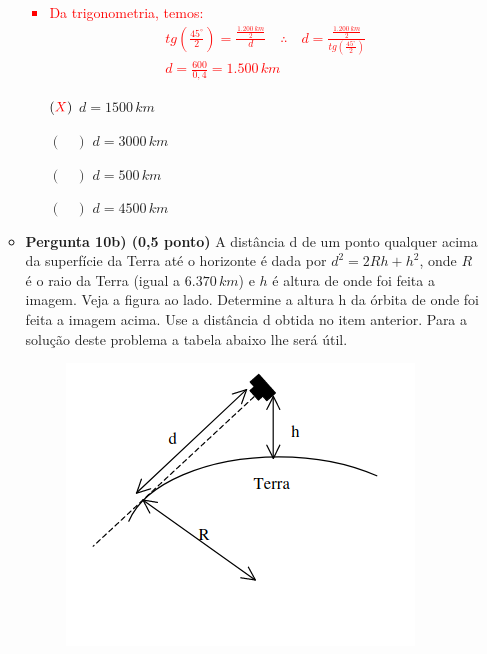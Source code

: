 \documentclass[a4paper, 12pt]{article}
\newcommand{\red}[1]{\textcolor{red}{#1}}
\begin{document}
\begin{flushleft}
\begin{itemize}
\begin{itemize}
\begin{figure}[H]
                        \end{figure}
                        \red{\begin{itemize}
                            \item Da trigonometria, temos:
                                \begin{equation*} \begin{gathered}
                                    tg \left(\frac{45^{\circ}}{2}\right) = \frac{\frac{1.200 \, km}{2}}{d} \quad \therefore \quad d = \frac{\frac{1.200 \, km}{2}}{tg \left(\frac{45^{\circ}}{2}\right)} \\
                                    d = \frac{600}{0,4} = 1.500 \, km
                                \end{gathered} \end{equation*}
                        \end{itemize}}
                        \begin{itemize}
                            \item[$(\red{X})$] $d = 1500 \, km$
                            \item[$(\quad)$] $d = 3000 \, km$
                            \item[$(\quad)$] $d = 500 \, km$
                            \item[$(\quad)$] $d = 4500 \, km$
                        \end{itemize}
                    \item \textbf{Pergunta 10b) (0,5 ponto)} A distância d de um ponto qualquer acima da superfície da Terra até o horizonte é dada por $d^2 = 2Rh + h^2$, onde $R$ é o raio da Terra (igual a $6.370 \, km$) e $h$ é altura de onde foi feita a imagem. Veja a figura ao lado. Determine a altura h da órbita de onde foi feita a imagem acima. Use a distância d obtida no item anterior. Para a solução deste problema a tabela abaixo lhe será útil.
                        \begin{figure}[H]
                            \centering
                            \includegraphics[scale=0.5]{img/10b.png}

\end{figure}
\end{itemize}
\end{itemize}
\end{flushleft}
\end{document}
